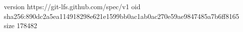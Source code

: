 version https://git-lfs.github.com/spec/v1
oid sha256:890dc2a5ea114918298e621e1599bb0ac1ab0ac270e59ae9847485a7b6ff8165
size 178482
